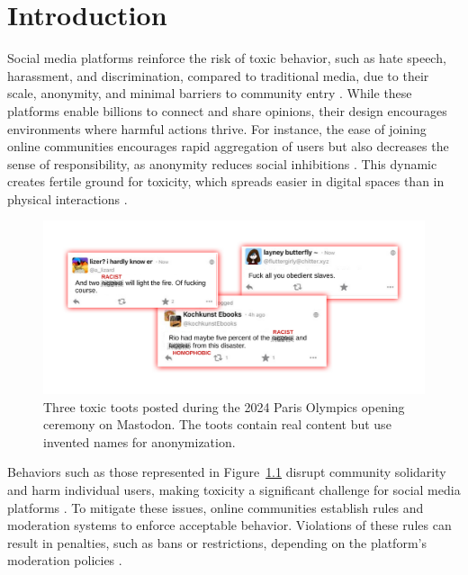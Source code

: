 \chapter{Introduction}\label{introduction}

Social media platforms reinforce the risk of toxic behavior, such as hate speech, harassment, and discrimination, compared to traditional media, due to their scale, anonymity, and minimal barriers to community entry \cite{fan:2022,suler:2004,ellison:2007}. While these platforms enable billions to connect and share opinions, their design encourages environments where harmful actions thrive. For instance, the ease of joining online communities encourages rapid aggregation of users \cite{ellison:2007} but also decreases the sense of responsibility, as anonymity reduces social inhibitions \cite{moore:2012,suler:2004,wulczyn:2017}. This dynamic creates fertile ground for toxicity, which spreads easier in digital spaces than in physical interactions \cite{suler:2004}.

\begin{figure}[tb]
  \centering
  \includegraphics[width=\linewidth]{../material/toxic_comments.pdf}
  \caption{Three toxic toots posted during the 2024 Paris Olympics opening ceremony on Mastodon. The toots contain real content but use invented names for anonymization.}
  \label{toxic-comments}
\end{figure}

Behaviors such as those represented in Figure~\ref{toxic-comments} disrupt community solidarity and harm individual users, making toxicity a significant challenge for social media platforms \cite{fan:2022,wulczyn:2017}. To mitigate these issues, online communities establish rules and moderation systems to enforce acceptable behavior. Violations of these rules can result in penalties, such as bans or restrictions, depending on the platform's moderation policies \cite{nicholson:2023}.


